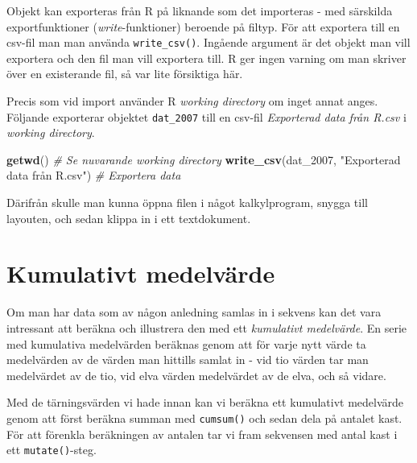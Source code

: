 \documentclass[
]{book}
\newenvironment{Shaded}{\begin{snugshade}}{\end{snugshade}}
\newcommand{\CommentTok}[1]{\textcolor[rgb]{0.56,0.35,0.01}{\textit{#1}}}
\newcommand{\FunctionTok}[1]{\textcolor[rgb]{0.13,0.29,0.53}{\textbf{#1}}}
\newcommand{\NormalTok}[1]{#1}
\newcommand{\StringTok}[1]{\textcolor[rgb]{0.31,0.60,0.02}{#1}}
\theoremstyle{definition}
\theoremstyle{definition}
\theoremstyle{definition}
\theoremstyle{definition}
\theoremstyle{remark}
\begin{document}
Objekt kan exporteras från R på liknande som det importeras - med särskilda exportfunktioner (\emph{write}-funktioner) beroende på filtyp. För att exportera till en csv-fil man man använda \texttt{write\_csv()}. Ingående argument är det objekt man vill exportera och den fil man vill exportera till. R ger ingen varning om man skriver över en existerande fil, så var lite försiktiga här.

Precis som vid import använder R \emph{working directory} om inget annat anges. Följande exporterar objektet \texttt{dat\_2007} till en csv-fil \emph{Exporterad data från R.csv} i \emph{working directory}.

\begin{Shaded}
\begin{Highlighting}[]
\FunctionTok{getwd}\NormalTok{()                          }\CommentTok{\# Se nuvarande working directory}
\FunctionTok{write\_csv}\NormalTok{(dat\_2007, }\StringTok{"Exporterad data från R.csv"}\NormalTok{) }\CommentTok{\# Exportera data}
\end{Highlighting}
\end{Shaded}

Därifrån skulle man kunna öppna filen i något kalkylprogram, snygga till layouten, och sedan klippa in i ett textdokument.

\section{Kumulativt medelvärde}\label{kumulativt-medelvuxe4rde}

Om man har data som av någon anledning samlas in i sekvens kan det vara intressant att beräkna och illustrera den med ett \emph{kumulativt medelvärde}. En serie med kumulativa medelvärden beräknas genom att för varje nytt värde ta medelvärden av de värden man hittills samlat in - vid tio värden tar man medelvärdet av de tio, vid elva värden medelvärdet av de elva, och så vidare.

Med de tärningsvärden vi hade innan kan vi beräkna ett kumulativt medelvärde genom att först beräkna summan med \texttt{cumsum()} och sedan dela på antalet kast. För att förenkla beräkningen av antalen tar vi fram sekvensen med antal kast i ett \texttt{mutate()}-steg.
\end{document}
